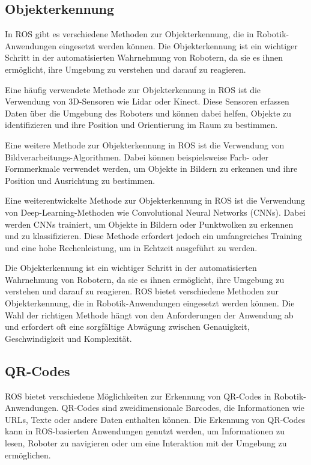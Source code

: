     \subsection{Objekterkennung} \label{objekterkennung:subsection}
    In \ac{ROS} gibt es verschiedene Methoden zur Objekterkennung, die in Robotik-Anwendungen eingesetzt werden können. Die Objekterkennung ist ein wichtiger Schritt in der automatisierten Wahrnehmung von Robotern, da sie es ihnen ermöglicht, ihre Umgebung zu verstehen und darauf zu reagieren.

    Eine häufig verwendete Methode zur Objekterkennung in \ac{ROS} ist die Verwendung von 3D-Sensoren wie Lidar oder Kinect. Diese Sensoren erfassen Daten über die Umgebung des Roboters und können dabei helfen, Objekte zu identifizieren und ihre Position und Orientierung im Raum zu bestimmen.

    Eine weitere Methode zur Objekterkennung in \ac{ROS} ist die Verwendung von Bildverarbeitungs-Algorithmen. Dabei können beispielsweise Farb- oder Formmerkmale verwendet werden, um Objekte in Bildern zu erkennen und ihre Position und Ausrichtung zu bestimmen.

    Eine weiterentwickelte Methode zur Objekterkennung in \ac{ROS} ist die Verwendung von Deep-Learning-Methoden wie Convolutional Neural Networks (CNNs). Dabei werden CNNs trainiert, um Objekte in Bildern oder Punktwolken zu erkennen und zu klassifizieren. Diese Methode erfordert jedoch ein umfangreiches Training und eine hohe Rechenleistung, um in Echtzeit ausgeführt zu werden.

    Die Objekterkennung ist ein wichtiger Schritt in der automatisierten Wahrnehmung von Robotern, da sie es ihnen ermöglicht, ihre Umgebung zu verstehen und darauf zu reagieren. \ac{ROS} bietet verschiedene Methoden zur Objekterkennung, die in Robotik-Anwendungen eingesetzt werden können. Die Wahl der richtigen Methode hängt von den Anforderungen der Anwendung ab und erfordert oft eine sorgfältige Abwägung zwischen Genauigkeit, Geschwindigkeit und Komplexität.

    \subsection{QR-Codes} \label{qr-codes:subsection}
    \ac{ROS} bietet verschiedene Möglichkeiten zur Erkennung von QR-Codes in Robotik-Anwendungen. QR-Codes sind zweidimensionale Barcodes, die Informationen wie URLs, Texte oder andere Daten enthalten können. Die Erkennung von QR-Codes kann in \ac{ROS}-basierten Anwendungen genutzt werden, um Informationen zu lesen, Roboter zu navigieren oder um eine Interaktion mit der Umgebung zu ermöglichen.


